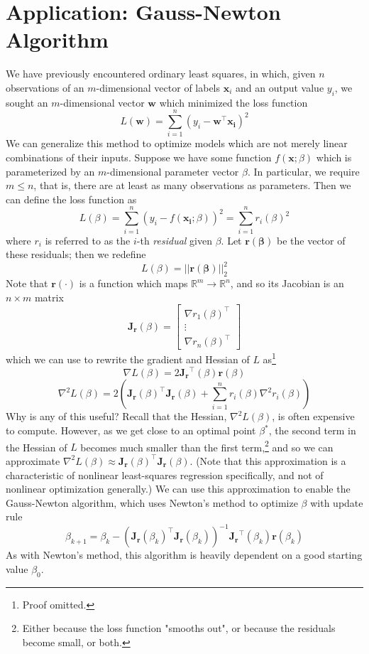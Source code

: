\documentclass{article}
\begin{document}
\clearpage
\section*{Application: Gauss-Newton Algorithm}
We have previously encountered ordinary least squares, in which, given $n$ observations of an $m$-dimensional vector of labels $\mathbf{x}_i$ and an output value $y_i$, we sought an $m$-dimensional vector $\mathbf{w}$ which minimized the loss function $$L(\mathbf{w}) = \sum_{i=1}^n (y_i - \mathbf{w^\top x_i})^2$$
We can generalize this method to optimize models which are not merely linear combinations of their inputs. Suppose we have some function $f(\mathbf{x};\beta)$ which is parameterized by an $m$-dimensional parameter vector $\beta$. In particular, we require $m \leq n$, that is, there are at least as many observations as parameters. Then we can define the loss function as
$$L(\beta) = \sum_{i=1}^n(y_i - f(\mathbf{x_i}; \beta))^2 = \sum_{i=1}^n r_i(\beta)^2$$
where $r_i$ is referred to as the $i$-th \textit{residual} given $\beta$. Let $\mathbf{r(\beta)}$ be the vector of these residuals; then we redefine
$$L(\beta) = ||\mathbf{r(\beta)}||_2^2$$
Note that $\mathbf{r(\cdot)}$ is a function which maps $\mathbb{R}^m \rightarrow \mathbb{R}^n$, and so its Jacobian is an $n \times m$ matrix
$$\mathbf{J_r}(\beta) = \begin{bmatrix} \nabla r_1(\beta)^\top \\ \vdots \\ \nabla r_n(\beta)^\top \end{bmatrix}$$
which we can use to rewrite the gradient and Hessian of $L$ as\footnote{Proof omitted.}
$$\nabla L(\beta) = 2\mathbf{J_r}^\top(\beta)\mathbf{r}(\beta)$$
$$\nabla^2 L(\beta) = 2(\mathbf{J_r}(\beta)^\top\mathbf{J_r}(\beta) + \sum_{i=1}^n r_i(\beta)\nabla^2r_i(\beta))$$
Why is any of this useful? Recall that the Hessian, $\nabla^2 L(\beta)$, is often expensive to compute. However, as we get close to an optimal point $\beta^*$, the second term in the Hessian of $L$ becomes much smaller than the first term,\footnote{Either because the loss function "smooths out", or because the residuals become small, or both.} and so we can approximate $\nabla^2 L(\beta) \approx \mathbf{J_r}(\beta)^\top\mathbf{J_r}(\beta)$. (Note that this approximation is a characteristic of nonlinear least-squares regression specifically, and not of nonlinear optimization generally.) We can use this approximation to enable the Gauss-Newton algorithm, which uses Newton's method to optimize $\beta$ with update rule 
$$\beta_{k+1} = \beta_k - (\mathbf{J_r}(\beta_k)^\top\mathbf{J_r}(\beta_k))^{-1}\mathbf{J_r}^\top(\beta_k)\mathbf{r}(\beta_k)$$
As with Newton's method, this algorithm is heavily dependent on a good starting value $\beta_0$.
\end{document}
